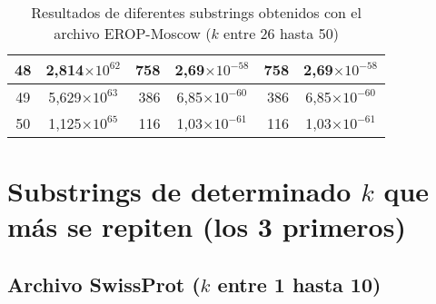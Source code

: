 \begin{table}[!hbt]
\begin{tabular}{| c  r  r  c  r  c |}
    48 & \multicolumn{1}{c}{2,814$\times 10^{62}$} & 758 & 2,69$\times 10^{-58}$ & 758 & 2,69$\times 10^{-58}$ \\ \hline  
    49 & \multicolumn{1}{c}{5,629$\times 10^{63}$} & 386 & 6,85$\times 10^{-60}$ & 386 & 6,85$\times 10^{-60}$ \\ \hline
    50 & \multicolumn{1}{c}{1,125$\times 10^{65}$} & 116 & 1,03$\times 10^{-61}$ & 116 & 1,03$\times 10^{-61}$ \\ \hline       
    \end{tabular}
    \caption{Resultados de diferentes substrings obtenidos con el archivo EROP-Moscow ($k$ entre 26 hasta 50)}
    \label{tb:labela32}
\end{table}

\newpage

\section*{Substrings de determinado $k$ que más se repiten (los 3 primeros)}

\subsection*{Archivo SwissProt ($k$ entre 1 hasta 10)}

